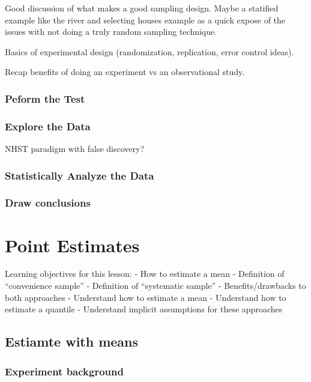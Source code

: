 \documentclass[]{book}
\theoremstyle{definition}
\theoremstyle{definition}
\theoremstyle{definition}
\theoremstyle{remark}
\begin{document}
Good discussion of what makes a good sampling design. Maybe a statified
example like the river and selecting houses example as a quick expose of
the issues with not doing a truly random sampling technique.

Basics of experimental design (randomization, replication, error control
ideas).

Recap benefits of doing an experiment vs an observational study.

\subsection{Peform the Test}\label{peform-the-test-1}

\subsection{Explore the Data}\label{explore-the-data}

NHST paradigm with false discovery?

\subsection{Statistically Analyze the
Data}\label{statistically-analyze-the-data-1}

\subsection{Draw conclusions}\label{draw-conclusions-1}

\chapter{Point Estimates}\label{point-estimates}

Learning objectives for this lesson: - How to estimate a mean -
Definition of ``convenience sample'' - Definition of ``systematic
sample'' - Benefits/drawbacks to both approaches - Understand how to
estimate a mean - Understand how to estimate a quantile - Understand
implicit assumptions for these approaches

\section{Estiamte with means}\label{estiamte-with-means}

\subsection{Experiment background}\label{experiment-background-2}
\end{document}
